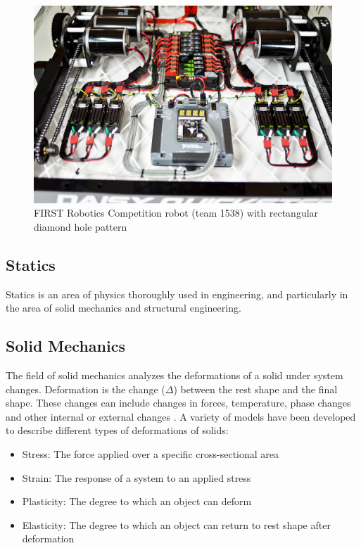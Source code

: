 \documentclass[12pt, letterpaper]{article}
\begin{document}
\begin{figure}[H]
	\centering
	\label{fig:frc1}
	\includegraphics[width=.8\linewidth]{frc-ex1}
	\caption{FIRST Robotics Competition robot (team 1538) with rectangular diamond hole pattern}
\end{figure}

\subsection{Statics}

Statics is an area of physics thoroughly used in engineering, and particularly in the area of solid mechanics and structural engineering. 

\subsection{Solid Mechanics}

The field of solid mechanics analyzes the deformations of a solid under system changes. Deformation is the change ($\Delta$) between the rest shape and the final shape. These changes can include changes in forces, temperature, phase changes and other internal or external changes \autocite{chou_elasticity:_1992}. A variety of models have been developed to describe different types of deformations of solids:



\begin{itemize}
\item Stress: The force applied over a specific cross-sectional area
\item Strain: The response of a system to an applied stress
\item Plasticity: The degree to which an object can deform
\item Elasticity: The degree to which an object can return to rest shape after deformation
\end{itemize}
\end{document}
